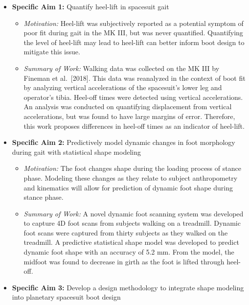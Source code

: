\documentclass[defaultstyle,11pt]{comps}
\providecommand{\tightlist}{%
  \setlength{\itemsep}{0pt}\setlength{\parskip}{0pt}}
\begin{document}
\begin{itemize}
\tightlist
\item
  \textbf{Specific Aim 1: } Quantify heel-lift in spacesuit gait

  \begin{itemize}
  \tightlist
  \item
    \emph{Motivation:} Heel-lift was subjectively reported as a potential symptom of poor fit during gait in the MK III, but was never quantified. Quantifying the level of heel-lift may lead to heel-lift can better inform boot design to mitigate this issue.
  \item
    \emph{Summary of Work:} Walking data was collected on the MK III by Fineman et al.~{[}2018{]}. This data was reanalyzed in the context of boot fit by analyzing vertical accelerations of the spacesuit's lower leg and operator's tibia. Heel-off times were detected using vertical accelerations. An analysis was conducted on quantifying displacement from vertical accelerations, but was found to have large margins of error. Therefore, this work proposes differences in heel-off times as an indicator of heel-lift.
  \end{itemize}
\item
  \textbf{Specific Aim 2: } Predictively model dynamic changes in foot morphology during gait with statistical shape modeling

  \begin{itemize}
  \tightlist
  \item
    \emph{Motivation:} The foot changes shape during the loading process of stance phase. Modeling these changes as they relate to subject anthropometry and kinematics will allow for prediction of dynamic foot shape during stance phase.
  \item
    \emph{Summary of Work:} A novel dynamic foot scanning system was developed to capture 4D foot scans from subjects walking on a treadmill. Dynamic foot scans were captured from thirty subjects as they walked on the treadmill. A predictive statistical shape model was developed to predict dynamic foot shape with an accuracy of 5.2 mm. From the model, the midfoot was found to decrease in girth as the foot is lifted through heel-off.
  \end{itemize}
\item
  \textbf{Specific Aim 3: } Develop a design methodology to integrate shape modeling into planetary spacesuit boot design


\end{itemize}
\end{document}
